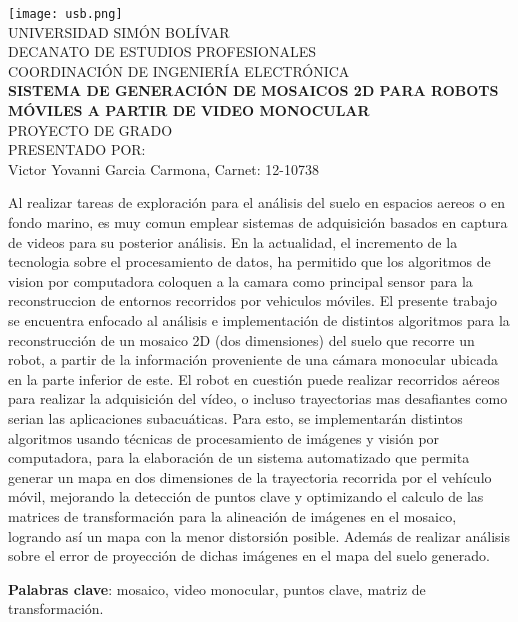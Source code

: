 \begin{titlepage}
    \begin{center}

        \texttt{[image: usb.png]} \\
        \textsc {\large UNIVERSIDAD SIMÓN BOLÍVAR} \\
        \textsc{DECANATO DE ESTUDIOS PROFESIONALES\\
        COORDINACIÓN DE INGENIERÍA ELECTRÓNICA}\\
        \textbf{SISTEMA DE GENERACIÓN DE MOSAICOS 2D PARA ROBOTS MÓVILES A PARTIR DE VIDEO MONOCULAR} \\
        PROYECTO DE GRADO \\
        PRESENTADO POR: \\
        Victor Yovanni Garcia Carmona, Carnet: 12-10738

    \end{center}
\abstract
{
    Al realizar tareas de exploración para el análisis del suelo en espacios aereos o en fondo marino, es muy comun emplear sistemas de adquisición basados en captura de videos para su posterior análisis. En la actualidad, el incremento de la tecnologia sobre el procesamiento de datos, ha permitido que los algoritmos de vision por computadora coloquen a la camara como principal sensor para la reconstruccion de entornos recorridos por vehiculos móviles. El presente trabajo se encuentra enfocado al análisis e implementación de distintos algoritmos para la reconstrucción de un mosaico 2D (dos dimensiones) del suelo que recorre un robot, a partir de la información proveniente de una cámara monocular ubicada en la parte inferior de este. El robot en cuestión puede realizar recorridos aéreos para realizar la adquisición del vídeo, o incluso trayectorias mas desafiantes como serian las aplicaciones subacuáticas. Para esto, se implementarán distintos algoritmos usando técnicas de procesamiento de imágenes y visión por computadora, para la elaboración de un sistema automatizado que permita generar un mapa en dos dimensiones de la trayectoria recorrida por el vehículo móvil, mejorando la detección de puntos clave y optimizando el calculo de las matrices de transformación para la alineación de imágenes en el mosaico, logrando así un mapa con la menor distorsión posible. Además de realizar análisis sobre el error de proyección de dichas imágenes en el mapa del suelo generado.
    
}

\noindent \begin{small} \textbf{Palabras clave}: mosaico, video monocular, puntos clave, matriz de transformación. 
\end{small}
	
\clearpage
{}

\end{titlepage}